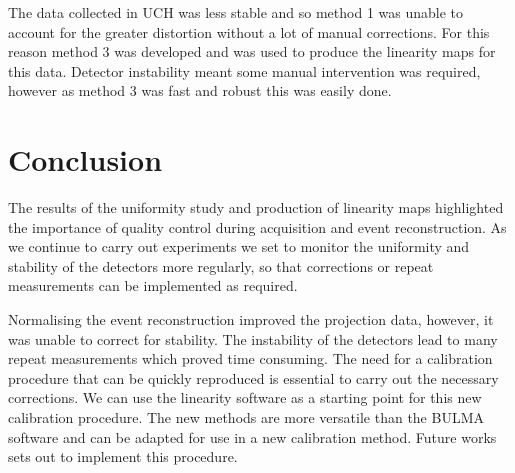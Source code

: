 The data collected in \acrshort{UCH} was less stable and so method 1 was unable to account for the greater distortion without a lot of manual corrections. For this reason method 3 was developed and was used to produce the linearity maps for this data. Detector instability meant some manual intervention was required, however as method 3 was fast and robust this was easily done. 
\section{Conclusion}
The results of the uniformity study and production of linearity maps highlighted the importance of quality control during acquisition and event reconstruction. As we continue to carry out experiments we set to monitor the uniformity and stability of the detectors more regularly, so that corrections or repeat measurements can be implemented as required.

Normalising the event reconstruction improved the projection data, however, it was unable to correct for stability. The instability of the detectors lead to many repeat measurements which proved time consuming. The need for a calibration procedure that can be quickly reproduced is essential to carry out the necessary corrections. We can use the linearity software as a starting point for this new calibration procedure. The new methods are more versatile than the BULMA software and can be adapted for use in a new calibration method. Future works sets out to implement this procedure. 
